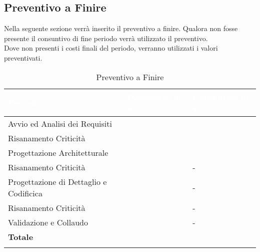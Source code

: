 \subsection{Preventivo a Finire}
\label{caption_paf}

Nella seguente sezione verrà inserito il preventivo a finire. Qualora non fosse presente il consuntivo di fine periodo verrà utilizzato il preventivo. \\
Dove non presenti i costi finali del periodo, verranno utilizzati i valori preventivati. \\

\begin{longtable}{| C{.30\textwidth}| C{.15\textwidth}| C{.20\textwidth}|}
\hline
{}\textbf{\textcolor{white}{Periodo}} & \textbf{\textcolor{white}{Preventivo in \euro}} & \textbf{\textcolor{white}{Consuntivo in \euro}} \\
\hline
Avvio ed Analisi dei Requisiti &  &  \\
\hline
{}Risanamento Criticità &   &  \\
\hline
Progettazione Architetturale &  &  \\
\hline
{} Risanamento Criticità &  & - \\
\hline
Progettazione di Dettaglio e Codificica &  & - \\
\hline
{} Risanamento Criticità &   & - \\
\hline
Validazione e Collaudo &   & - \\
\hline
{}\textbf{Totale} &   &   \\
\hline
\caption{Preventivo a Finire}
\label{paf}
\end{longtable}

